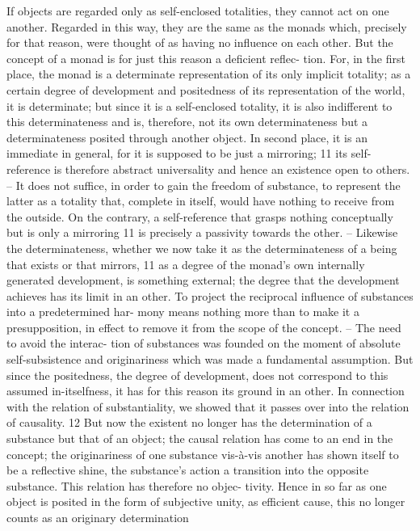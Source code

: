 If objects are regarded only as self-enclosed totalities, they cannot act on
one another. Regarded in this way, they are the same as the monads which,
precisely for that reason, were thought of as having no influence on each
other. But the concept of a monad is for just this reason a deficient reflec-
tion. For, in the first place, the monad is a determinate representation of its
only implicit totality; as a certain degree of development and positedness of its
representation of the world, it is determinate; but since it is a self-enclosed
totality, it is also indifferent to this determinateness and is, therefore, not its
own determinateness but a determinateness posited through another object.
In second place, it is an immediate in general, for it is supposed to be just a
mirroring; 11 its self-reference is therefore abstract universality and hence an
existence open to others. – It does not suffice, in order to gain the freedom of
substance, to represent the latter as a totality that, complete in itself, would
have nothing to receive from the outside. On the contrary, a self-reference
that grasps nothing conceptually but is only a mirroring 11 is precisely a
passivity towards the other. – Likewise the determinateness, whether we now
take it as the determinateness of a being that exists or that mirrors, 11 as a
degree of the monad’s own internally generated development, is something
external; the degree that the development achieves has its limit in an other.
To project the reciprocal influence of substances into a predetermined har-
mony means nothing more than to make it a presupposition, in effect to
remove it from the scope of the concept. – The need to avoid the interac-
tion of substances was founded on the moment of absolute self-subsistence
and originariness which was made a fundamental assumption. But since
the positedness, the degree of development, does not correspond to this
assumed in-itselfness, it has for this reason its ground in an other.
In connection with the relation of substantiality, we showed that it passes
over into the relation of causality. 12 But now the existent no longer has the
determination of a substance but that of an object; the causal relation has
come to an end in the concept; the originariness of one substance vis-à-vis
another has shown itself to be a reflective shine, the substance’s action a
transition into the opposite substance. This relation has therefore no objec-
tivity. Hence in so far as one object is posited in the form of subjective
unity, as efficient cause, this no longer counts as an originary determination
